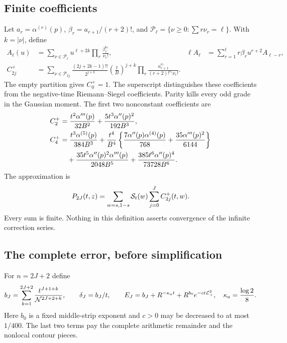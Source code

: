 \subsection{Finite coefficients}
Let $a_r=\alpha^{(r)}(p)$, $\beta_r=a_{r+1}/(r+2)!$, and
$\mathcal P_\ell=\{\nu\ge0:\sum r\nu_r=\ell\}$. With $k=|\nu|$,
define
\begin{align}
 A_\ell(u)&=\sum_{\nu\in\mathcal P_\ell}u^{\ell+2k}
                       \prod_r\frac{\beta_r^{\nu_r}}{\nu_r!},
 &\ell A_\ell&=\sum_{r=1}^\ell r\beta_r u^{r+2}A_{\ell-r},\\
 C_{2j}^{+}&=\sum_{\nu\in\mathcal P_{2j}}
 \frac{(2j+2k-1)!!}{2^{j+k}}
 \left(\frac tB\right)^{j+k}
 \prod_r\frac{a_{r+1}^{\nu_r}}{(r+2)!^{\nu_r}\nu_r!}.
 \label{eq:positive-coefficients}
\end{align}
The empty partition gives $C_0^+=1$. The superscript distinguishes
these coefficients from the negative-time Riemann--Siegel coefficients.
Parity kills every odd grade in the Gaussian moment. The first two
nonconstant coefficients are
\begin{align}
 C_2^+&=\frac{t^2\alpha'''(p)}{32B^2}
               +\frac{5t^3\alpha''(p)^2}{192B^3},\label{eq:c2}\\
 C_4^+&=\frac{t^3\alpha^{(5)}(p)}{384B^3}
 +\frac{t^4}{B^4}\left\{\frac{7\alpha''(p)\alpha^{(4)}(p)}{768}
                  +\frac{35\alpha'''(p)^2}{6144}\right\}\notag\\
 &\hspace{1em}+\frac{35t^5\alpha''(p)^2\alpha'''(p)}{2048B^5}
                  +\frac{385t^6\alpha''(p)^4}{73728B^6}.
 \label{eq:c4}
\end{align}
The approximation is
\begin{equation}
 P_{2J}(t,z)=\sum_{w=s,1-s}\mathcal S_t(w)\sum_{j=0}^J C_{2j}^+(t,w).
 \label{eq:positive-model}
\end{equation}
Every sum is finite. Nothing in this definition asserts convergence
of the infinite correction series.

\subsection{The complete error, before simplification}
For $n=2J+2$ define
\begin{equation}
 b_J=\sum_{k=1}^{2J+2}\frac{t^{J+1+k}}{\mathcal N^{2J+2+k}},\qquad
 \delta_J=b_J/t,\qquad
 E_J=b_J+R^{-\kappa_a t}+R^{b_0}e^{-ct\mathcal L_+^2},
 \quad\kappa_a=\frac{\log2}{8}.
 \label{eq:positive-budget}
\end{equation}
Here $b_0$ is a fixed middle-strip exponent and $c>0$ may be decreased
to at most $1/400$. The last two terms pay the complete arithmetic
remainder and the nonlocal contour pieces.

